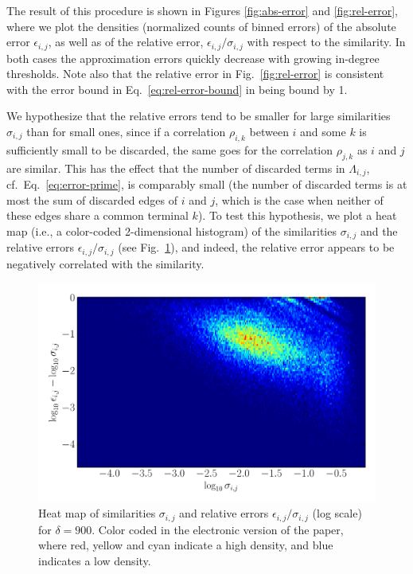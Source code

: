 \documentclass{kais}
\begin{document}
The result of this procedure is shown in Figures \ref{fig:abs-error} and \ref{fig:rel-error}, where we
plot the densities (normalized counts of binned errors) of the absolute error $\epsilon_{i,j}$, as well as of the relative error, 
$\epsilon_{i,j}/\sigma_{i,j}$ with respect to the similarity. In both cases the approximation
errors quickly decrease with growing in-degree thresholds. Note also that the relative error in 
Fig.\ \ref{fig:rel-error} is consistent with the error bound in Eq.\ \ref{eq:rel-error-bound} in being bound by 1.

We hypothesize that the relative errors tend to be smaller for large similarities $\sigma_{i,j}$ than for
 small ones, since if a correlation $\rho_{i,k}$ between $i$ and some $k$ is sufficiently small to be discarded,
the same goes for the correlation $\rho_{j,k}$  as $i$ and $j$ are similar. This has the effect that the number of
discarded terms in  $\Lambda_{i,j}$, cf.~Eq.~\ref{eq:error-prime}, is comparably small (the number 
of discarded terms is at most the sum of discarded edges of $i$ and $j$, which is the case when neither of these
edges share a common terminal $k$). To test this hypothesis, we plot a heat map (i.e., a color-coded 2-dimensional 
histogram) of the similarities $\sigma_{i,j}$ and the relative errors $\epsilon_{i,j}/\sigma_{i,j}$ (see Fig.\ \ref{fig:error-heatmap}), 
and indeed, the relative error appears to be negatively correlated with the similarity.

\begin{figure}
\centerline{\includegraphics[width=0.75\columnwidth]{figures/1446451652-relative_error-heatmap-900.pdf}}
\caption{Heat map of similarities $\sigma_{i,j}$ and relative errors $\epsilon_{i,j}/\sigma_{i,j}$ (log scale)
for $\delta = 900$. Color coded in the electronic version of the paper, where red, yellow and cyan indicate a 
high density, and blue indicates a low density.}
\label{fig:error-heatmap}
\end{figure}
\end{document}
